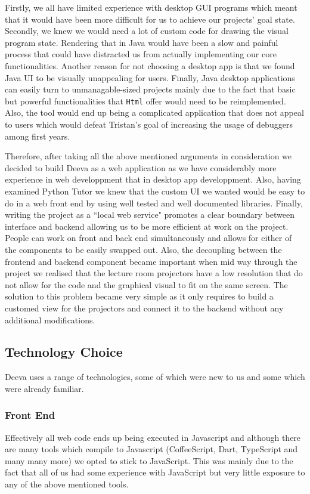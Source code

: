 \documentclass[11pt, a4paper]{article}
\begin{document}
Firstly, we all have limited experience with desktop GUI programs which meant that it would have been more difficult for us to achieve our projects' goal state.
Secondly, we knew we would need a lot of custom code for drawing the visual program state.
Rendering that in Java would have been a slow and painful process that could have distracted us from actually implementing our core functionalities.
Another reason for not choosing a desktop app is that we found Java UI to be visually unappealing for users.
Finally, Java desktop applications can easily turn to unmanagable-sized projects mainly due to the fact that basic but powerful functionalities that \texttt{Html} offer would need to be reimplemented.
Also, the tool would end up being a complicated application that does not appeal to users which would defeat Tristan's goal of increasing the usage of debuggers among first years.

Therefore, after taking all the above mentioned arguments in consideration we decided to build Deeva as a web application as we have considerably more experience in web developpment that in desktop app developpment.
Also, having examined Python Tutor we knew that the custom UI we wanted would be easy to do in a web front end by using well tested and well documented libraries.
Finally, writing the project as a ``local web service" promotes a clear boundary between interface and backend allowing us to be more efficient at work on the project.
People can work on front and back end simultaneously and allows for either of the components to be easily swapped out.
Also, the decoupling between the frontend and backend component became important when mid way through the project we realised that the lecture room projectors have a low resolution that do not allow for the code and the graphical visual to fit on the same screen.
The solution to this problem became very simple as it only requires to build a customed view for the projectors and connect it to the backend without any additional modifications.

\subsection{Technology Choice}
Deeva uses a range of technologies, some of which were new to us and some which were already familiar.

\subsubsection{Front End}
Effectively all web code ends up being executed in Javascript and although there are many tools which compile to Javascript (CoffeeScript, Dart, TypeScript and many many more) we opted to stick to JavaScript. 
This was mainly due to the fact that all of us had some experience with JavaScript but very little exposure to any of the above mentioned tools.
\end{document}
